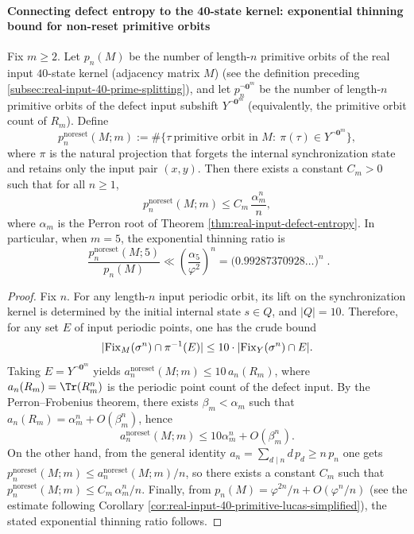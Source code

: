 \paragraph{Connecting defect entropy to the 40-state kernel: exponential thinning bound for non-reset primitive orbits}
\begin{theorem}\label{thm:real-input-40-nonreset-primes-thin}
Fix $m\ge 2$.
Let $p_n(M)$ be the number of length-$n$ primitive orbits of the real input $40$-state kernel (adjacency matrix $M$) (see the definition preceding \ref{subsec:real-input-40-prime-splitting}),
and let $p_n^{\neg \mathbf{0}^m}$ be the number of length-$n$ primitive orbits of the defect input subshift $Y^{\neg \mathbf{0}^m}$ (equivalently, the primitive orbit count of $R_m$).
Define
\[
p_n^{\mathrm{noreset}}(M;m)
:=\#\{\tau\ \text{primitive orbit in }M:\ \pi(\tau)\in Y^{\neg \mathbf{0}^m}\},
\]
where $\pi$ is the natural projection that forgets the internal synchronization state and retains only the input pair $(x,y)$.
Then there exists a constant $C_m>0$ such that for all $n\ge 1$,
\[
p_n^{\mathrm{noreset}}(M;m)\le C_m\,\frac{\alpha_m^n}{n},
\]
where $\alpha_m$ is the Perron root of Theorem \ref{thm:real-input-defect-entropy}.
In particular, when $m=5$, the exponential thinning ratio is
\[
\boxed{\;
\frac{p_n^{\mathrm{noreset}}(M;5)}{p_n(M)}
\ll
\left(\frac{\alpha_5}{\varphi^2}\right)^n
=\bigl(0.99287370928\ldots\bigr)^n\; }.
\]
\end{theorem}
\begin{proof}
Fix $n$.
For any length-$n$ input periodic orbit, its lift on the synchronization kernel is determined by the initial internal state $s\in Q$, and $|Q|=10$.
Therefore, for any set $E$ of input periodic points, one has the crude bound
\[
|{\rm Fix}_M(\sigma^n)\cap \pi^{-1}(E)|
\le 10\cdot |{\rm Fix}_Y(\sigma^n)\cap E|.
\]
Taking $E=Y^{\neg \mathbf{0}^m}$ yields
\(
a_n^{\mathrm{noreset}}(M;m)\le 10\,a_n(R_m)
\), where $a_n(R_m)=\Tr(R_m^n)$ is the periodic point count of the defect input.
By the Perron--Frobenius theorem, there exists $\beta_m<\alpha_m$ such that
\(
a_n(R_m)=\alpha_m^n+O(\beta_m^n)
\), hence
\[
a_n^{\mathrm{noreset}}(M;m)\le 10\alpha_m^n+O(\beta_m^n).
\]
On the other hand, from the general identity $a_n=\sum_{d\mid n} d\,p_d\ge n\,p_n$ one gets
\(
p_n^{\mathrm{noreset}}(M;m)\le a_n^{\mathrm{noreset}}(M;m)/n
\), so there exists a constant $C_m$ such that
\(
p_n^{\mathrm{noreset}}(M;m)\le C_m\,\alpha_m^n/n
\).
Finally, from $p_n(M)=\varphi^{2n}/n+O(\varphi^n/n)$ (see the estimate following Corollary \ref{cor:real-input-40-primitive-lucas-simplified}), the stated exponential thinning ratio follows.
\end{proof}


